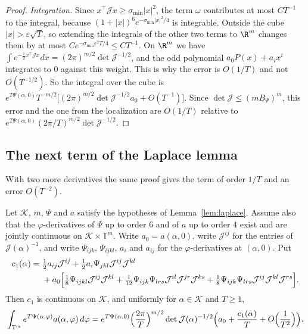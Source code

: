 \begin{proof}
\emph{Integration.} Since $x^\top\mathcal Jx\ge \sigma_{\min}|x|^2$, the term
$\omega$ contributes at most $CT^{-1}$ to the integral, because
$(1+|x|)^6e^{-\sigma_{\min}|x|^2/4}$ is integrable. Outside the cube
$|x|>\varepsilon\sqrt T$, so extending the integrals of the other two terms to
$\R^m$ changes them by at most $Ce^{-\sigma_{\min}\varepsilon^2T/4}\le CT^{-1}$. On
$\R^m$ we have
$\int e^{-\frac12x^\top\mathcal Jx}dx=(2\pi)^{m/2}\det\mathcal J^{-1/2}$, and
the odd polynomial $a_0P(x)+a_ix^i$ integrates to $0$ against this weight.
This is why the error
is $O(1/T)$ and not $O(T^{-1/2})$. So the integral over the cube is
$e^{T\Psi(\alpha,0)}T^{-m/2}\bigl[(2\pi)^{m/2}\det\mathcal J^{-1/2}a_0
+O(T^{-1})\bigr]$. Since $\det\mathcal J\le(mB_\Psi)^m$, this error and the
one from the localization are $O(1/T)$ relative to
$e^{T\Psi(\alpha,0)}(2\pi/T)^{m/2}\det\mathcal J^{-1/2}$.
\end{proof}

\subsection{The next term of the Laplace lemma}\label{app:laplace-next}

With two more derivatives the same proof gives the term of order $1/T$ and an
error $O(T^{-2})$.

\begin{lemma}\label{lem:laplace2}
Let $\mathcal K$, $m$, $\Psi$ and $a$ satisfy the hypotheses of
Lemma~\ref{lem:laplace}. Assume also that the $\varphi$-derivatives of $\Psi$
up to order $6$ and of $a$ up to order $4$ exist and are jointly continuous on
$\mathcal K\times\mathbb T^m$. Write $a_0=a(\alpha,0)$, write
$\mathcal J^{ij}$ for the entries of $\mathcal J(\alpha)^{-1}$, and write
$\Psi_{ijk}$, $\Psi_{ijkl}$, $a_i$ and $a_{ij}$ for the $\varphi$-derivatives
at $(\alpha,0)$. Put
\begin{equation}\label{eq:laplace-c1}
\begin{aligned}
c_1(\alpha)={}&\tfrac12a_{ij}\mathcal J^{ij}
+\tfrac12a_i\Psi_{jkl}\mathcal J^{ij}\mathcal J^{kl}\\
&+a_0\Bigl[\tfrac18\Psi_{ijkl}\mathcal J^{ij}\mathcal J^{kl}
+\tfrac1{12}\Psi_{ijk}\Psi_{lrs}\mathcal J^{il}\mathcal J^{jr}\mathcal J^{ks}
+\tfrac18\Psi_{ijk}\Psi_{lrs}\mathcal J^{ij}\mathcal J^{kl}\mathcal J^{rs}\Bigr].
\end{aligned}
\end{equation}
Then $c_1$ is continuous on $\mathcal K$, and uniformly for
$\alpha\in\mathcal K$ and $T\ge1$,
\[
\int_{\mathbb T^m}e^{T\Psi(\alpha,\varphi)}a(\alpha,\varphi)\,d\varphi
=e^{T\Psi(\alpha,0)}\Bigl(\frac{2\pi}T\Bigr)^{m/2}\det\mathcal J(\alpha)^{-1/2}
\Bigl(a_0+\frac{c_1(\alpha)}T+O\Bigl(\frac1{T^2}\Bigr)\Bigr).
\]
\end{lemma}

